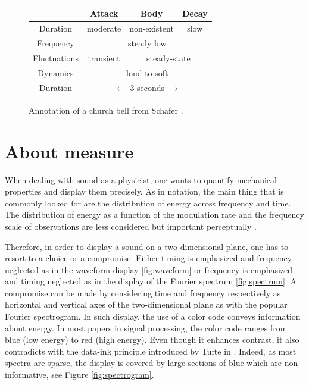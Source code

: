 \documentclass{article}
\begin{document}
\begin{figure}
\begin{tabular}{|c|c|c|c|}
\hline
& Attack & Body & Decay \\
\hline
Duration & moderate & non-existent & slow \\
\hline
Frequency  & \multicolumn{3}{c|}{steady low} \\
\hline
Fluctuations  & transient & \multicolumn{2}{c|}{steady-state} \\
\hline
Dynamics  & \multicolumn{3}{c|}{loud to soft} \\
\hline
Duration & \multicolumn{3}{c|}{ $\longleftarrow$ 3 seconds $\longrightarrow$ } \\
\hline
\end{tabular}
\caption{Annotation of a church bell from Schafer \cite{Schafer1977}.}
\label{fig:notation}
\end{figure}


\section{About measure}\label{sec:physicist}

When dealing with sound as a physicist, one wants to quantify mechanical properties and display them precisely. As in notation, the main thing that is commonly looked for are the distribution of energy across frequency and time. The distribution of energy as a function of the modulation rate and the frequency scale of observations are less considered but important perceptually  \cite{Chi2005a, Anden2011}.

Therefore, in order to display a sound on a two-dimensional plane, one has to resort to a choice or a compromise. Either timing is emphasized  and  frequency neglected as in the waveform display \ref{fig:waveform} or frequency is emphasized  and timing neglected  as in the display of the Fourier spectrum \ref{fig:spectrum}. A compromise can be made by considering time and frequency respectively as horizontal and vertical axes of the two-dimensional plane as with the popular Fourier spectrogram. In such display, the use of a color code conveys information about energy.  In most papers in signal processing, the color code ranges from blue (low energy) to red (high energy). Even though it enhances contrast, it also contradicts with the data-ink principle introduced by Tufte in \cite{Tufte1983}. Indeed, as most spectra are sparse, the display is covered by large sections of blue which are non informative, see Figure \ref{fig:spectrogram}.
\end{document}
